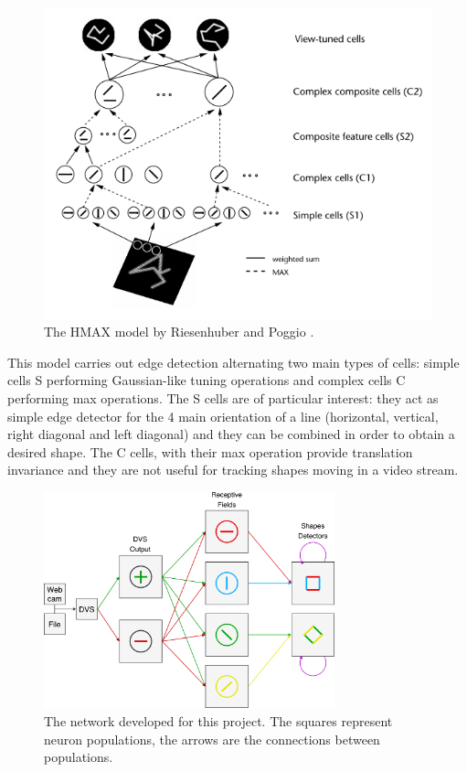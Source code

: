 \begin{figure}[ht]
\centering
\includegraphics[scale=0.4]{images/development/hmax.png}
\caption[HMAX Model]{The HMAX model by Riesenhuber and Poggio \cite{Riesenhuber1999}.}
\label{fig:hmax}
\end{figure}

This model carries out edge detection alternating two main types of cells: simple cells \textsc{S} performing Gaussian-like tuning operations and complex cells \textsc{C} performing max operations. The \textsc{S} cells are of particular interest: they act as simple edge detector for the 4 main orientation of a line (horizontal, vertical, right diagonal and left diagonal) and they can be combined in order to obtain a desired shape. The \textsc{C} cells, with their max operation provide translation invariance and they are not useful for tracking shapes moving in a video stream.

\begin{figure}[ht]
\centering
\includegraphics[width=0.75\textwidth]{images/development/network.png}
\caption[Network Overview]{The network developed for this project. The squares represent neuron populations, the arrows are the connections between populations.}
\label{fig:network}
\end{figure}

